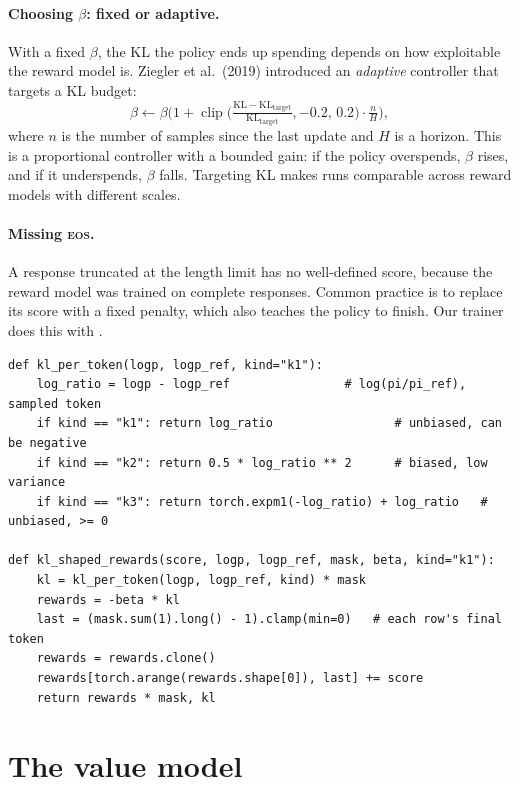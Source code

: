 \paragraph{Choosing $\beta$: fixed or adaptive.} With a fixed $\beta$, the KL the policy ends up
spending depends on how exploitable the reward model is. Ziegler et al.\ (2019) introduced an
\emph{adaptive} controller that targets a KL budget:
\begin{equation}
  \beta \leftarrow \beta\Big(1 + \operatorname{clip}\big(\tfrac{\mathrm{KL}-\mathrm{KL}_{\text{target}}}{\mathrm{KL}_{\text{target}}},
  -0.2,\,0.2\big)\cdot \tfrac{n}{H}\Big),
\end{equation}
where $n$ is the number of samples since the last update and $H$ is a horizon. This is a
proportional controller with a bounded gain: if the policy overspends, $\beta$ rises, and if it
underspends, $\beta$ falls. Targeting KL makes runs comparable across reward models with
different scales.

\paragraph{Missing \textsc{eos}.} A response truncated at the length limit has no well-defined
score, because the reward model was trained on complete responses. Common practice is to replace its
score with a fixed penalty, which also teaches the policy to finish. Our trainer does this with
.

\begin{lstlisting}[caption={KL estimators and the shaped reward (\ident{llmsys/rlhf/losses.py}).},label={lst:rlhf:shaped}]
def kl_per_token(logp, logp_ref, kind="k1"):
    log_ratio = logp - logp_ref                # log(pi/pi_ref), sampled token
    if kind == "k1": return log_ratio                 # unbiased, can be negative
    if kind == "k2": return 0.5 * log_ratio ** 2      # biased, low variance
    if kind == "k3": return torch.expm1(-log_ratio) + log_ratio   # unbiased, >= 0

def kl_shaped_rewards(score, logp, logp_ref, mask, beta, kind="k1"):
    kl = kl_per_token(logp, logp_ref, kind) * mask
    rewards = -beta * kl
    last = (mask.sum(1).long() - 1).clamp(min=0)   # each row's final token
    rewards = rewards.clone()
    rewards[torch.arange(rewards.shape[0]), last] += score
    return rewards * mask, kl
\end{lstlisting}

\section{The value model}\label{sec:rlhf:value}

